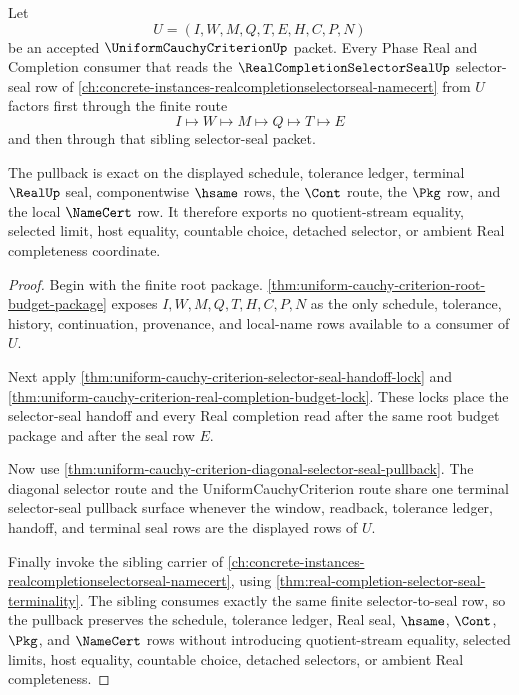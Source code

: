\begin{theorem}
\label{thm:uniform-cauchy-criterion-selector-seal-exact-pullback}
Let
$$
U=(I,W,M,Q,T,E,H,C,P,N)
$$
be an accepted $\UniformCauchyCriterionUp$ packet. Every Phase Real and Completion consumer that reads the $\RealCompletionSelectorSealUp$ selector-seal row of \autoref{ch:concrete-instances-realcompletionselectorseal-namecert} from $U$ factors first through the finite route
$$
I \longmapsto W \longmapsto M \longmapsto Q \longmapsto T \longmapsto E
$$
and then through that sibling selector-seal packet.

The pullback is exact on the displayed schedule, tolerance ledger, terminal $\RealUp$ seal, componentwise $\hsame$ rows, the $\Cont$ route, the $\Pkg$ row, and the local $\NameCert$ row. It therefore exports no quotient-stream equality, selected limit, host equality, countable choice, detached selector, or ambient Real completeness coordinate.
\end{theorem}
\begin{proof}
Begin with the finite root package. \autoref{thm:uniform-cauchy-criterion-root-budget-package} exposes $I,W,M,Q,T,H,C,P,N$ as the only schedule, tolerance, history, continuation, provenance, and local-name rows available to a consumer of $U$.

Next apply \autoref{thm:uniform-cauchy-criterion-selector-seal-handoff-lock} and \autoref{thm:uniform-cauchy-criterion-real-completion-budget-lock}. These locks place the selector-seal handoff and every Real completion read after the same root budget package and after the seal row $E$.

Now use \autoref{thm:uniform-cauchy-criterion-diagonal-selector-seal-pullback}. The diagonal selector route and the UniformCauchyCriterion route share one terminal selector-seal pullback surface whenever the window, readback, tolerance ledger, handoff, and terminal seal rows are the displayed rows of $U$.

Finally invoke the sibling carrier of \autoref{ch:concrete-instances-realcompletionselectorseal-namecert}, using \autoref{thm:real-completion-selector-seal-terminality}. The sibling consumes exactly the same finite selector-to-seal row, so the pullback preserves the schedule, tolerance ledger, Real seal, $\hsame$, $\Cont$, $\Pkg$, and $\NameCert$ rows without introducing quotient-stream equality, selected limits, host equality, countable choice, detached selectors, or ambient Real completeness.
\end{proof}

